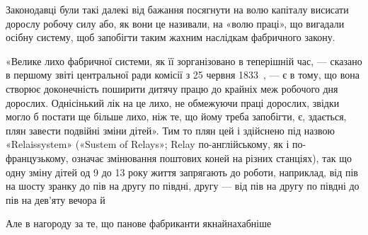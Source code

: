 Законодавці були такі далекі від бажання посягнути на волю
капіталу висисати дорослу робочу силу або, як вони це називали,
на «волю праці», що вигадали осібну систему, щоб запобігти
таким жахним наслідкам фабричного закону.

«Велике лихо фабричної системи, як її зорганізовано в теперішній
час, — сказано в першому звіті центральної ради комісії
з 25 червня 1833~, — є в тому, що вона створює доконечність
поширити дитячу працю до крайніх меж робочого дня дорослих.
Однісінький лік на це лихо, не обмежуючи праці дорослих, звідки
могло б постати ще більше лихо, ніж те, що йому треба запобігти,
є, здається, плян завести подвійні зміни дітей». Тим то плян цей
і здійснено під назвою «Relaissystem» («Sustem of Relays»; Relay
по-англійському, як і по-французькому, означає змінювання
поштових коней на різних станціях), так що одну зміну дітей
од 9 до 13 року життя запрягають до роботи, наприклад, від пів
на шосту зранку до пів на другу по півдні, другу — від пів на другу
по півдні до пів на дев’яту вечора й~

Але в нагороду за те, що панове фабриканти якнайнахабніше
\parbreak{}  %
